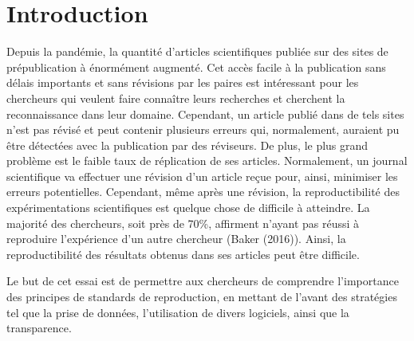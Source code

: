 \documentclass[9pt,twocolumn,twoside,]{pnas-new}
\title{}
\author[a]{Laura Béland}
\affil[a]{Université de Sherbrooke, Départment de biologie, 2500
Boulevard de l'Université, Sherbrooke, Québec, J1K 2R1}
\begin{document}
\verticaladjustment{-2pt}



\maketitle
\thispagestyle{firststyle}


\acknow{}

\hypertarget{introduction}{%
\section{Introduction}\label{introduction}}

Depuis la pandémie, la quantité d'articles scientifiques publiée sur des
sites de prépublication à énormément augmenté. Cet accès facile à la
publication sans délais importants et sans révisions par les paires est
intéressant pour les chercheurs qui veulent faire connaître leurs
recherches et cherchent la reconnaissance dans leur domaine. Cependant,
un article publié dans de tels sites n'est pas révisé et peut contenir
plusieurs erreurs qui, normalement, auraient pu être détectées avec la
publication par des réviseurs. De plus, le plus grand problème est le
faible taux de réplication de ses articles. Normalement, un journal
scientifique va effectuer une révision d'un article reçue pour, ainsi,
minimiser les erreurs potentielles. Cependant, même après une révision,
la reproductibilité des expérimentations scientifiques est quelque chose
de difficile à atteindre. La majorité des chercheurs, soit près de 70\%,
affirment n'ayant pas réussi à reproduire l'expérience d'un autre
chercheur (Baker (2016)). Ainsi, la reproductibilité des résultats
obtenus dans ses articles peut être difficile.

Le but de cet essai est de permettre aux chercheurs de comprendre
l'importance des principes de standards de reproduction, en mettant de
l'avant des stratégies tel que la prise de données, l'utilisation de
divers logiciels, ainsi que la transparence.
\end{document}
